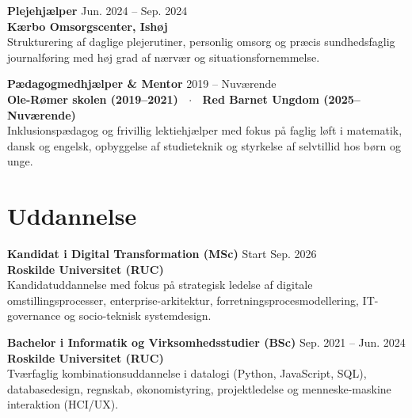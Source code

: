 \documentclass[9.5pt,a4paper]{article}
\begin{document}
\vspace{3pt}

\textbf{\fontsize{9.5}{11.5}\selectfont Plejehjælper} \hfill {\fontsize{8.5}{10.5}\selectfont\color{mutedgray}Jun. 2024 -- Sep. 2024} \\
{\fontsize{8.5}{10.5}\selectfont\textbf{\color{accent}Kærbo Omsorgscenter, Ishøj}} \\[2pt]
{\fontsize{8.5}{11}\selectfont\color{darkslate}
Strukturering af daglige plejerutiner, personlig omsorg og præcis sundhedsfaglig journalføring med høj grad af nærvær og situationsfornemmelse.
}

\vspace{3pt}

\textbf{\fontsize{9.5}{11.5}\selectfont Pædagogmedhjælper \& Mentor} \hfill {\fontsize{8.5}{10.5}\selectfont\color{mutedgray}2019 -- Nuværende} \\
{\fontsize{8.5}{10.5}\selectfont\textbf{\color{accent}Ole-Rømer skolen (2019--2021) \ $\cdot$ \ Red Barnet Ungdom (2025--Nuværende)}} \\[2pt]
{\fontsize{8.5}{11}\selectfont\color{darkslate}
Inklusionspædagog og frivillig lektiehjælper med fokus på faglig løft i matematik, dansk og engelsk, opbyggelse af studieteknik og styrkelse af selvtillid hos børn og unge.
}

\section{Uddannelse}

\textbf{\fontsize{9.5}{11.5}\selectfont Kandidat i Digital Transformation (MSc)} \hfill {\fontsize{8.5}{10.5}\selectfont\color{mutedgray}Start Sep. 2026} \\
{\fontsize{8.5}{10.5}\selectfont\textbf{\color{accent}Roskilde Universitet (RUC)}} \\[2pt]
{\fontsize{8.5}{11}\selectfont\color{darkslate}
Kandidatuddannelse med fokus på strategisk ledelse af digitale omstillingsprocesser, enterprise-arkitektur, forretningsprocesmodellering, IT-governance og socio-teknisk systemdesign.
}

\vspace{3pt}

\textbf{\fontsize{9.5}{11.5}\selectfont Bachelor i Informatik og Virksomhedsstudier (BSc)} \hfill {\fontsize{8.5}{10.5}\selectfont\color{mutedgray}Sep. 2021 -- Jun. 2024} \\
{\fontsize{8.5}{10.5}\selectfont\textbf{\color{accent}Roskilde Universitet (RUC)}} \\[2pt]
{\fontsize{8.5}{11}\selectfont\color{darkslate}
Tværfaglig kombinationsuddannelse i datalogi (Python, JavaScript, SQL), databasedesign, regnskab, økonomistyring, projektledelse og menneske-maskine interaktion (HCI/UX).
}
\end{document}

